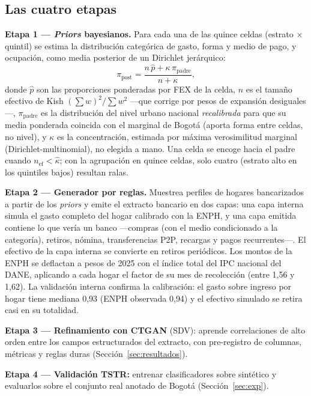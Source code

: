 \documentclass[journal]{IEEEtai}
\begin{document}
\subsection{Las cuatro etapas}
\textbf{Etapa 1 — \textit{Priors} bayesianos.} Para cada una de las quince celdas (estrato $\times$ quintil) se estima la distribución categórica de gasto, forma y medio de pago, y ocupación, como media posterior de un Dirichlet jerárquico:
\begin{equation}
\pi_{\text{post}} = \frac{n\,\hat{p} + \kappa\,\pi_{\text{padre}}}{n + \kappa},
\label{eq:prior}
\end{equation}
donde $\hat{p}$ son las proporciones ponderadas por FEX de la celda, $n$ es el tamaño efectivo de Kish $(\sum w)^2/\sum w^2$ —que corrige por pesos de expansión desiguales—, $\pi_{\text{padre}}$ es la distribución del nivel urbano nacional \emph{recalibrada} para que su media ponderada coincida con el marginal de Bogotá (aporta forma entre celdas, no nivel), y $\kappa$ es la concentración, estimada por máxima verosimilitud marginal (Dirichlet-multinomial), no elegida a mano. Una celda se encoge hacia el padre cuando $n_{\text{ef}} < \hat{\kappa}$; con la agrupación en quince celdas, solo cuatro (estrato alto en los quintiles bajos) resultan ralas.

\textbf{Etapa 2 — Generador por reglas.} Muestrea perfiles de hogares bancarizados a partir de los \textit{priors} y emite el extracto bancario en dos capas: una capa interna simula el gasto completo del hogar calibrado con la ENPH, y una capa emitida contiene lo que vería un banco —compras (con el medio condicionado a la categoría), retiros, nómina, transferencias P2P, recargas y pagos recurrentes—. El efectivo de la capa interna se convierte en retiros periódicos. Los montos de la ENPH se deflactan a pesos de 2025 con el índice total del IPC nacional del DANE, aplicando a cada hogar el factor de su mes de recolección (entre 1{,}56 y 1{,}62). La validación interna confirma la calibración: el gasto sobre ingreso por hogar tiene mediana 0{,}93 (ENPH observada 0{,}94) y el efectivo simulado se retira casi en su totalidad.

\textbf{Etapa 3 — Refinamiento con CTGAN} (SDV): aprende correlaciones de alto orden entre los campos estructurados del extracto, con pre-registro de columnas, métricas y reglas duras (Sección~\ref{sec:resultados}).

\textbf{Etapa 4 — Validación TSTR:} entrenar clasificadores sobre sintético y evaluarlos sobre el conjunto real anotado de Bogotá (Sección~\ref{sec:exp}).
\end{document}
